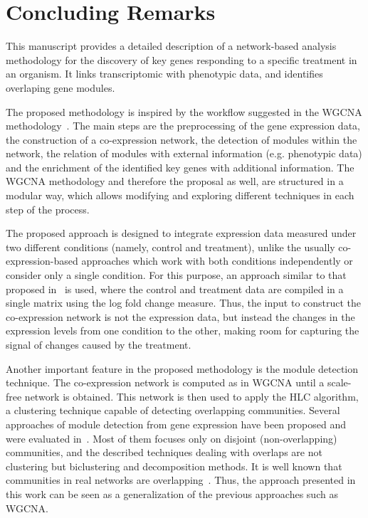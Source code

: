 \section{Concluding Remarks}
\label{sec.concl}

This manuscript provides a detailed description of a network-based analysis
methodology for the discovery of key genes responding to
a specific treatment in an organism. It links transcriptomic with
phenotypic data, and identifies overlaping gene modules.

The proposed methodology is inspired by the workflow suggested in the
WGCNA methodology~\cite{langfelder2008wgcna}. The main steps are the
preprocessing of the gene expression data, the construction of a
co-expression network, the detection of modules within the network,
the relation of modules with external information (e.g. phenotypic data)
and the enrichment of the identified key genes with additional information.
The WGCNA methodology and therefore the proposal as well, are structured
in a modular way, which allows modifying and  exploring different techniques
in each step of the process.

The proposed approach is designed to integrate expression data
measured under two different conditions (namely, control and treatment),
unlike the usually co-expression-based approaches which work with both
conditions independently or consider only a single condition. For this
purpose, an approach similar to that proposed in~\cite{du2019network}
is used, where the control and treatment data are compiled in a single
matrix using the log fold change measure. Thus, the input to construct
the co-expression network is not the expression data, but instead the changes
in the expression levels from one condition to the other, making room for capturing
the signal of changes caused by the treatment.

Another important feature in the proposed methodology is the module
detection technique. The co-expression network is computed as in
WGCNA until a scale-free network is obtained. This network is then
used to apply the HLC algorithm, a clustering technique capable of
detecting overlapping communities. Several approaches of module
detection from gene expression have been proposed and were evaluated
in~\cite{saelens2018comprehensive}. Most of them focuses only on
disjoint (non-overlapping) communities, and the described techniques
dealing with overlaps are not clustering but biclustering and
decomposition methods. It is well known that communities in real
networks are overlapping~\cite{palla2005uncovering}. Thus, the approach
presented in this work can be seen as a generalization of the previous 
approaches such as WGCNA.

